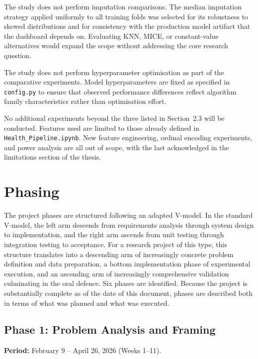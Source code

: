 \documentclass[11pt,a4paper]{article}
\begin{document}
The study does not perform imputation comparisons. The median imputation strategy applied uniformly to all training folds was selected for its robustness to skewed distributions and for consistency with the production model artifact that the dashboard depends on. Evaluating KNN, MICE, or constant-value alternatives would expand the scope without addressing the core research question.

The study does not perform hyperparameter optimisation as part of the comparative experiments. Model hyperparameters are fixed as specified in \texttt{config.py} to ensure that observed performance differences reflect algorithm family characteristics rather than optimisation effort.

No additional experiments beyond the three listed in Section~2.3 will be conducted. Features used are limited to those already defined in \texttt{Health\_Pipeline.ipynb}. New feature engineering, ordinal encoding experiments, and power analysis are all out of scope, with the last acknowledged in the limitations section of the thesis.

\section{Phasing}

The project phases are structured following an adapted V-model. In the standard V-model, the left arm descends from requirements analysis through system design to implementation, and the right arm ascends from unit testing through integration testing to acceptance. For a research project of this type, this structure translates into a descending arm of increasingly concrete problem definition and data preparation, a bottom implementation phase of experimental execution, and an ascending arm of increasingly comprehensive validation culminating in the oral defence. Six phases are identified. Because the project is substantially complete as of the date of this document, phases are described both in terms of what was planned and what was executed.

\subsection{Phase 1: Problem Analysis and Framing}

\textbf{Period:} February 9 -- April 26, 2026 (Weeks 1--11).
\end{document}
